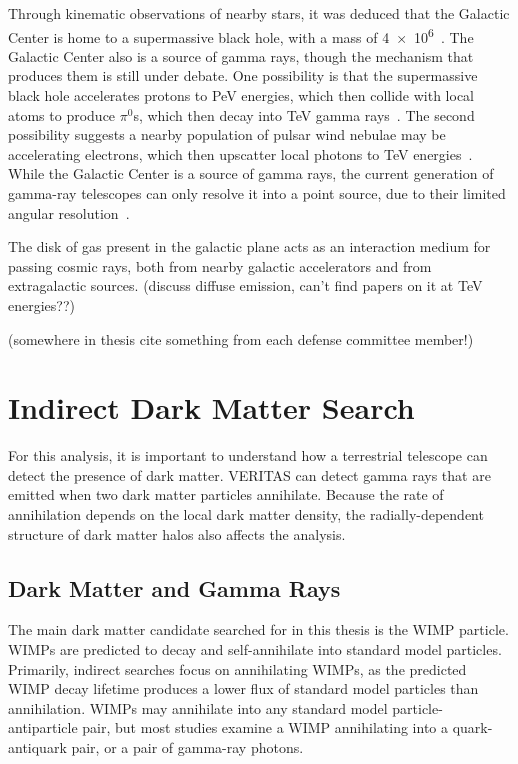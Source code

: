   Through kinematic observations of nearby stars, it was deduced that the Galactic Center is home to a supermassive black hole, with a mass of \SI{4e6}{\Msol}~\cite{sgra_massdist}.
  The Galactic Center also is a source of \TeV{} gamma rays, though the mechanism that produces them is still under debate.
  One possibility is that the supermassive black hole accelerates protons to PeV energies, which then collide with local atoms to produce $\pi^0$s, which then decay into TeV gamma rays~\cite{gc_pevatron}.
  The second possibility suggests a nearby population of pulsar wind nebulae may be accelerating electrons, which then upscatter local photons to TeV energies~\cite{gc_pulsars}.
  While the Galactic Center is a source of gamma rays, the current generation of gamma-ray telescopes can only resolve it into a point source, due to their limited angular resolution~\cite{VeritasGCRidge2015,gc_pointsrc_hess}.

  The disk of gas present in the galactic plane acts as an interaction medium for passing cosmic rays, both from nearby galactic accelerators and from extragalactic sources.
  {\color{red}(discuss diffuse emission, can't find papers on it at TeV energies??)}

  {\color{red}(somewhere in thesis cite something from each defense committee member!)}

\section{Indirect Dark Matter Search}
  For this analysis, it is important to understand how a terrestrial telescope can detect the presence of dark matter.
  VERITAS can detect gamma rays that are emitted when two dark matter particles annihilate.
  Because the rate of annihilation depends on the local dark matter density, the radially-dependent structure of dark matter halos also affects the analysis.

  \subsection{Dark Matter and Gamma Rays}
    The main dark matter candidate searched for in this thesis is the WIMP particle.
    WIMPs are predicted to decay and self-annihilate into standard model particles.
    Primarily, indirect searches focus on annihilating WIMPs, as the predicted WIMP decay lifetime produces a lower flux of standard model particles than annihilation.
    WIMPs may annihilate into any standard model particle-antiparticle pair, but most studies examine a WIMP annihilating into a quark-antiquark pair, or a pair of gamma-ray photons.

